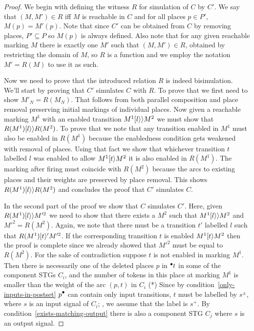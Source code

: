 \begin{proof}
We begin with defining the witness $R$ for simulation of $C$ by $C'$.
We say that $(M,M') \in R$ iff $M$ is reachable in $C$ and 
for all places $p \in P'$, $M(p)=M'(p)$.
Note that since $C'$ can be obtained from $C$ by removing places, $P' \subseteq P$ so $M(p)$ is always defined.
Also note that for any given reachable marking $M$ there is exactly one $M'$ such that $(M,M') \in R$, obtained by 
restricting the domain of $M$, so $R$ is a function and we employ the notation $M' = R(M)$ to use it as such.

Now we need to prove that the introduced relation $R$ is indeed bisimulation. 
We'll start by proving that $C'$ simulates $C$ with $R$.
To prove that we first need to show $M'_N = R(M_N)$. That follows from both parallel composition and place removal preserving initial markings of individual places.
Now given a reachable marking $M^1$ with an enabled transition $M^1 [l\rangle\rangle M^2$ we must show that $R(M^1) [l\rangle\rangle R(M^2)$. To prove that we note that any transition enabled in $M^1$ must also be enabled in $R(M^1)$ because the enabledness condition gets weakened with removal of places. Using that fact we show that whichever transition $t$ labelled $l$ was enabled to allow $M^1 [t\rangle M^2$ it is also enabled in $R(M^1)$. The marking after firing must coincide with $R(M^2)$ because the arcs to existing places and their weights are preserved by place removal. This shows $R(M^1) [l\rangle\rangle R(M^2)$ and concludes the proof that $C'$ simulates $C$.

In the second part of the proof we show that $C$ simulates $C'$. Here, given $R(M^1) [l\rangle\rangle M'^2$ we need to show that there exists a $M^2$ such that $M^1 [l\rangle\rangle M^2$ and $M'^2 = R(M^2)$. Again, we note that there must be a transition $t'$ labelled $l$ such that $R(M^1) [t\rangle' M'^2$. If the corresponding transition $t$ is enabled $M^1 [t\rangle M^2$ then the proof is complete since we already showed that $M'^2$ must be equal to $R(M^2)$. For the sake of contradiction suppose $t$ is not enabled in marking $M^1$. Then there is necessarily one of the deleted places $p$ in ${}^\bullet {t}$ in some of the component STGs $C_i$, and the number of tokens in this place at marking $M^1$ is
smaller than the weight of the arc $(p,t)$ in $C_i$ (*)
Since by condition~\ref{only-inputs-in-postset} $\post{p}$ can
contain only input transitions, $t$ must be labelled by
$s^\pm$, where $s$ is an input signal of $C_i$; \wlogg, we
assume that the label is $s^+$. By
condition~\ref{exists-matching-output} there is also a
component STG $C_j$ where $s$ is an output signal.


\end{proof}
